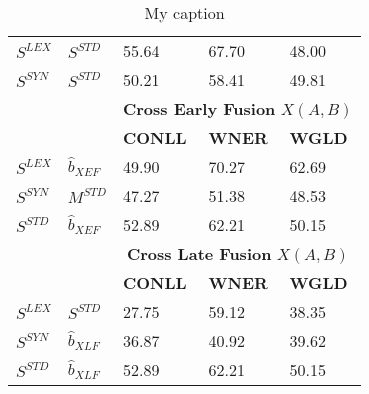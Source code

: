 \begin{table}[h]
\begin{minipage}{0.48\textwidth}
\begin{tabular}{@{}lllll@{}}
$S^{LEX}$ & $S^{STD}$ & 55.64                      & 67.70                     & 48.00                     \\
$S^{SYN}$ & $S^{STD}$ & 50.21                      & 58.41                     & 49.81                     \\
\midrule
          &           & \multicolumn{3}{c}{\textbf{Cross Early Fusion} $X(A,B)$} \\
\midrule
          &           & \textbf{CONLL}                      & \textbf{WNER}                      & \textbf{WGLD}                      \\ \cmidrule{3-5}
$S^{LEX}$ & $\hat{b}_{\scriptscriptstyle XEF}$        & 49.90                      & 70.27                     & 62.69                     \\
$S^{SYN}$ & $M^{STD}$ & 47.27                      & 51.38                     & 48.53                     \\
$S^{STD}$ & $\hat{b}_{\scriptscriptstyle XEF}$        & 52.89                      & 62.21                     & 50.15                     \\
\midrule
          &           & \multicolumn{3}{c}{\textbf{Cross Late Fusion} $X(A,B)$}  \\
\midrule
          &           & \textbf{CONLL}                      & \textbf{WNER}                      & \textbf{WGLD}                      \\ \cmidrule{3-5}
$S^{LEX}$ & $S^{STD}$ & 27.75                      & 59.12                     & 38.35                     \\
$S^{SYN}$ & $\hat{b}_{\scriptscriptstyle XLF}$       & 36.87                      & 40.92                     & 39.62                     \\
$S^{STD}$ & $\hat{b}_{\scriptscriptstyle XLF}$        & 52.89                      & 62.21                     & 50.15                     \\ \bottomrule
\end{tabular}
\caption{My caption}
\end{minipage}
\end{table}


